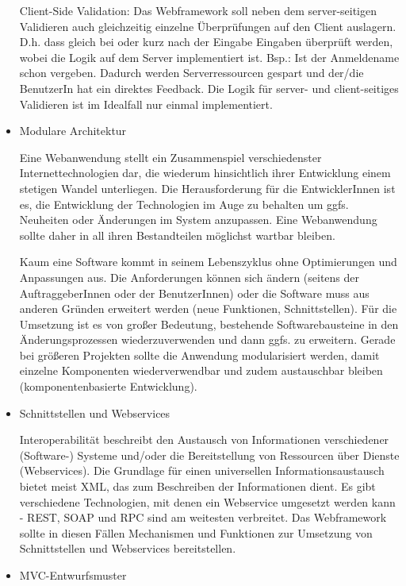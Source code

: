 \documentclass[
11pt, %
a4paper, %
BCOR25mm, %
DIV14, %
footsepline = false, %
headsepline, %
twoside, %
openright,
abstracton, %
listof=totocnumbered, %
bibliography=totocnumbered %
]{scrreprt}
\begin{document}
\begin{itemize}
Client-Side Validation: Das Webframework soll neben dem server-seitigen
Validieren auch gleichzeitig einzelne Überprüfungen auf den Client auslagern.
D.h. dass gleich bei oder kurz nach der Eingabe Eingaben überprüft werden,
wobei die Logik auf dem Server implementiert ist. Bsp.: Ist der Anmeldename
schon vergeben. Dadurch werden Serverressourcen gespart und der/die BenutzerIn
hat ein direktes Feedback. Die Logik für server- und client-seitiges Validieren
ist im Idealfall nur einmal implementiert.

  \item Modulare Architektur

Eine Webanwendung stellt ein Zusammenspiel verschiedenster Internettechnologien
dar, die wiederum hinsichtlich ihrer Entwicklung einem stetigen Wandel
unterliegen. Die Herausforderung für die EntwicklerInnen ist es, die
Entwicklung der Technologien im Auge zu behalten um ggfs. Neuheiten oder
Änderungen im System anzupassen. Eine Webanwendung sollte daher in all ihren
Bestandteilen möglichst wartbar bleiben.

Kaum eine Software kommt in seinem Lebenszyklus ohne Optimierungen und
Anpassungen aus. Die Anforderungen können sich ändern (seitens der
AuftraggeberInnen oder der BenutzerInnen) oder die Software muss aus anderen
Gründen erweitert werden (neue Funktionen, Schnittstellen). Für die Umsetzung
ist es von großer Bedeutung, bestehende Softwarebausteine in den
Änderungsprozessen wiederzuverwenden und dann ggfs. zu erweitern. Gerade bei
größeren Projekten sollte die Anwendung modularisiert werden, damit einzelne
Komponenten wiederverwendbar und zudem austauschbar bleiben
(komponentenbasierte Entwicklung).

  \item Schnittstellen und Webservices

Interoperabilität beschreibt den Austausch von Informationen verschiedener
(Software-) Systeme und/oder die Bereitstellung von Ressourcen über Dienste
(Webservices). Die Grundlage für einen universellen Informationsaustausch
bietet meist XML, das zum Beschreiben der Informationen dient. Es gibt
verschiedene Technologien, mit denen ein Webservice umgesetzt werden kann -
REST, SOAP und RPC sind am weitesten verbreitet. Das Webframework sollte in
diesen Fällen Mechanismen und Funktionen zur Umsetzung von Schnittstellen und
Webservices bereitstellen.

  \item MVC-Entwurfsmuster


\end{itemize}
\end{document}
